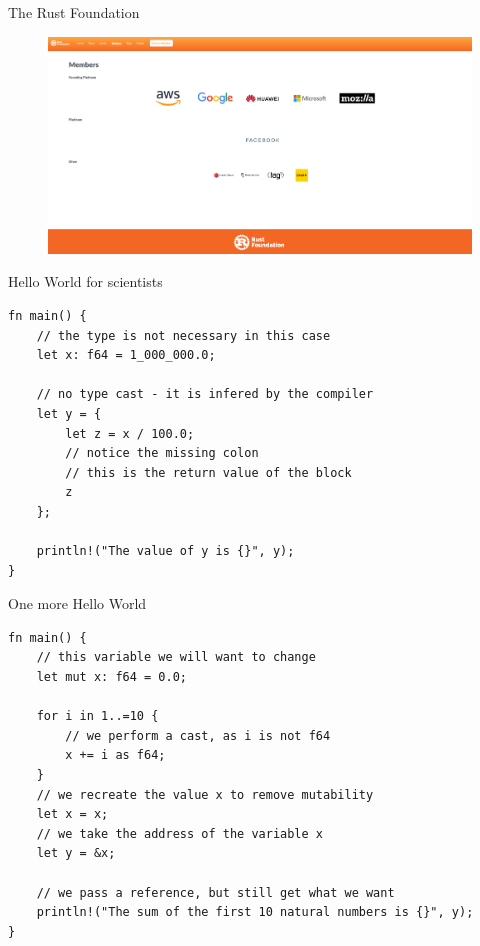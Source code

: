 \documentclass[8pt]{beamer}
\begin{document}
\begin{frame}{The Rust Foundation}
	\begin{figure}
		\centering
		\includegraphics[keepaspectratio=true,width=1\linewidth]{RustFoundation}
		\label{fig:rustfoundation}
	\end{figure}
\end{frame}

\begin{frame}[fragile]{Hello World for scientists}
\begin{verbatim}
fn main() {
	// the type is not necessary in this case
	let x: f64 = 1_000_000.0; 
	
	// no type cast - it is infered by the compiler
	let y = { 
		let z = x / 100.0;
		// notice the missing colon 
		// this is the return value of the block 
		z 
	};
	
	println!("The value of y is {}", y);
}
\end{verbatim}
\end{frame}

\begin{frame}[fragile]{One more Hello World}
\begin{verbatim}
fn main() {
	// this variable we will want to change
	let mut x: f64 = 0.0; 

	for i in 1..=10 {
		// we perform a cast, as i is not f64
		x += i as f64; 
	}
	// we recreate the value x to remove mutability
	let x = x; 
	// we take the address of the variable x
	let y = &x; 

	// we pass a reference, but still get what we want
	println!("The sum of the first 10 natural numbers is {}", y);  	
}
\end{verbatim}
\end{frame}
\end{document}
